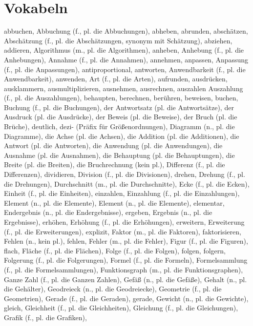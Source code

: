 \section{Vokabeln}

abbuchen,
Abbuchung (f., pl. die Abbuchungen),
abheben,
abrunden,
abschätzen,
Abschätzung (f., pl. die Abschätzungen, synonym mit Schätzung),
abziehen,
addieren,
Algorithmus (m., pl. die Algorithmen),
anheben,
Anhebung (f., pl. die Anhebungen),
Annahme (f., pl. die Annahmen),
annehmen,
anpassen,
Anpassung (f., pl. die Anpassungen),
antiproportional,
antworten,
Anwendbarkeit (f., pl. die Anwendbarkeit),
anwenden,
Art (f., pl. die Arten),
aufrunden,
ausdrücken,
ausklammern,
ausmultiplizieren,
ausnehmen,
ausrechnen,
auszahlen
Auszahlung (f., pl. die Auszahlungen),
behaupten,
berechnen,
berühren,
beweisen,
buchen,
Buchung (f., pl. die Buchungen),
der Antwortsatz (pl. die Antwortsätze),
der Ausdruck (pl. die Ausdrücke),
der Beweis (pl. die Beweise),
der Bruch (pl. die Brüche),
deutlich,
dezi- (Präfix für Größenordnungen),
Diagramm (n., pl. die Diagramme),
die Achse (pl. die Achsen),
die Addition (pl. die Additionen),
die Antwort (pl. die Antworten),
die Anwendung (pl. die Anwendungen),
die Ausnahme (pl. die Ausnahmen),
die Behauptung (pl. die Behauptungen),
die Breite (pl. die Breiten),
die Bruchrechnung (kein pl.),
Differenz (f., pl. die Differenzen),
dividieren,
Division (f., pl. die Divisionen),
drehen,
Drehung (f., pl. die Drehungen),
Durchschnitt (m., pl. die Durchschnitte),
Ecke (f., pl. die Ecken),
Einheit (f., pl. die Einheiten),
einzahlen,
Einzahlung (f., pl. die Einzahlungen),
Element (n., pl. die Elemente),
Element (n., pl. die Elemente),
elementar,
Endergebnis (n., pl. die Endergebnisse),
ergeben,
Ergebnis (n., pl. die Ergebnisse),
erhöhen,
Erhöhung (f., pl. die Erhöhungen),
erweitern,
Erweiterung (f., pl. die Erweiterungen),
explizit,
Faktor (m., pl. die Faktoren),
faktorisieren,
Fehlen (n., kein pl.),
fehlen,
Fehler (m., pl. die Fehler),
Figur (f., pl. die Figuren),
flach,
Fläche (f., pl. die Flächen),
Folge (f., pl. die Folgen),
folgen,
folgern,
Folgerung (f., pl. die Folgerungen),
Formel (f., pl. die Formeln),
Formelsammlung (f., pl. die Formelsammlungen),
Funktionsgraph (m., pl. die Funktionsgraphen),
Ganze Zahl (f., pl. die Ganzen Zahlen),
Gefäß (n., pl. die Gefäße),
Gehalt (n., pl. die Gehälter),
Geodreieck (n., pl. die Geodreiecke),
Geometrie (f., pl. die Geometrien),
Gerade (f., pl. die Geraden),
gerade,
Gewicht (n., pl. die Gewichte),
gleich,
Gleichheit (f., pl. die Gleichheiten),
Gleichung (f., pl. die Gleichungen),
Grafik (f., pl. die Grafiken),
